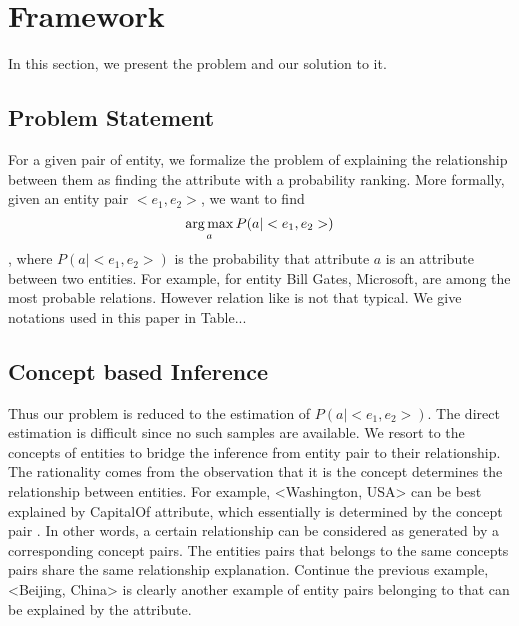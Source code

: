 
\section{Framework}
\label{sec:framework}

In this section, we present the problem and our solution to it.

\subsection{Problem Statement}

For a given pair of entity, we formalize the problem of explaining the relationship between them as finding the attribute with a probability ranking.
More formally, given an entity pair $<e_1, e_2>$, we want to find
\begin{equation}
\operatorname*{arg\,max}_a P(a|<e_1,e_2>)
\end{equation},
where $P(a|<e_1, e_2>)$ is the probability that attribute $a$ is an attribute between two entities.
For example, for entity \ac{Bill Gates, Microsoft},  are among the most probable relations.
However relation like  is not that typical. We give notations used in this paper in Table...

\subsection{Concept based Inference}
Thus our problem is reduced to the estimation of $P(a|<e_1, e_2>)$.
The direct estimation is difficult since no such samples are available.
We resort to the concepts of entities to bridge the inference from entity pair to their relationship.
The rationality comes from the observation that it is the concept determines the relationship between entities.
For example, \ac{<Washington, USA>} can be best explained by \ac{CapitalOf} attribute, which essentially is determined by the concept pair .
In other words, a certain relationship can be considered as generated by a corresponding concept pairs.
The entities pairs that belongs to the same concepts pairs share the same relationship explanation.
Continue the previous example, \ac{<Beijing, China>} is clearly another example of entity pairs belonging to  that can be explained by the  attribute.

